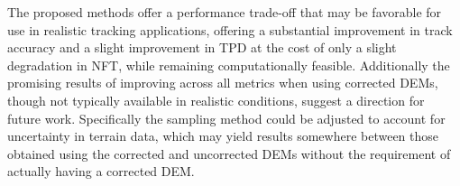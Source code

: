 \documentclass[journal]{IEEEtran}
\begin{document}
The proposed methods offer a performance trade-off that may be favorable for use in realistic tracking applications, offering a substantial improvement in track accuracy and a slight improvement in TPD at the cost of only a slight degradation in NFT, while remaining computationally feasible. Additionally the promising results of improving across all metrics when using corrected DEMs, though not typically available in realistic conditions, suggest a direction for future work. Specifically the sampling method could be adjusted to account for uncertainty in terrain data, which may yield results somewhere between those obtained using the corrected and uncorrected DEMs without the requirement of actually having a corrected DEM.




\end{document}
